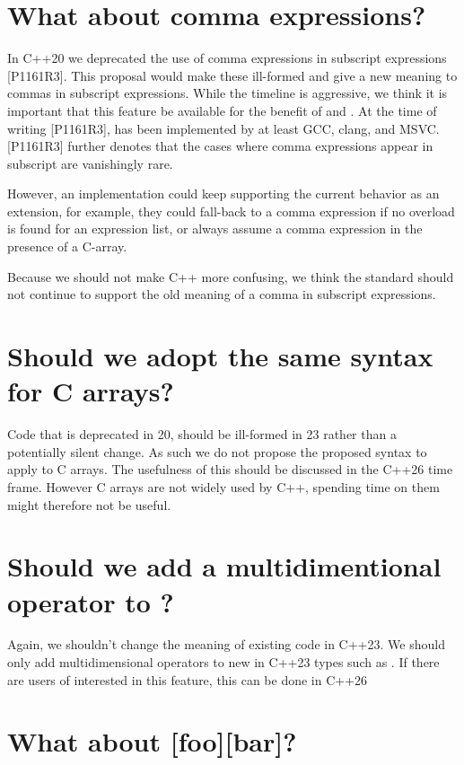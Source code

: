 \documentclass{wg21}
\begin{document}
\section{What about comma expressions?}

In C++20 we deprecated the use of comma expressions in subscript expressions [P1161R3]\cite{P1161R3}.
This proposal would make these ill-formed and give a new meaning to commas in subscript expressions.
While the timeline is aggressive, we think it is important that this feature be available for the benefit of  and .
At the time of writing [P1161R3], \cite{P1161R3} has been implemented by at least GCC, clang, and MSVC.
[P1161R3]\cite{P1161R3} further denotes that the cases where comma expressions appear in subscript are vanishingly rare.

However, an implementation could keep supporting the current behavior as an extension, for example, they could fall-back to a comma expression if no overload is found for an expression list, or always assume a comma expression in the presence of a C-array.

Because we should not make C++ more confusing, we think the standard should not continue to support the old meaning of a comma
in subscript expressions.


\section{Should we adopt the same syntax for C arrays?}

Code that is deprecated in 20, should be ill-formed in 23 rather than a potentially silent change.
As such we do not propose the proposed syntax to apply to C arrays.
The usefulness of this should be discussed in the C++26 time frame.
However C arrays are not widely used by C++, spending time on them might therefore not be useful.

\section{Should we add a multidimentional operator to ?}

Again, we shouldn't change the meaning of existing code in C++23.
We should only add multidimensional operators to new in C++23 types such as .
If there are users of  interested in this feature, this can be done in C++26

\section{What about [foo][bar]?}
\end{document}
